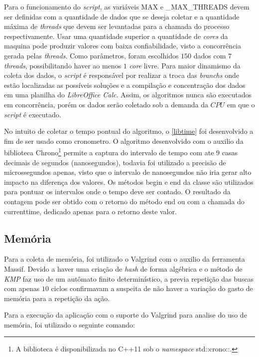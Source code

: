 Para o funcionamento do \textit{script}, as variáveis {\code MAX} e {\code \_MAX\_THREADS} devem ser definidas com a quantidade de dados que se deseja coletar e a quantidade máxima de \textit{threads} que devem ser levantadas para a chamada do processo respectivamente. Usar uma quantidade superior a quantidade de \textit{cores}  da maquina pode produzir valores com baixa confiabilidade, visto a concorrência gerada pelas \textit{threads}. Como parâmetros, foram escolhidos $150$ dados com $7$ \textit{threads}, possibilitando haver ao menos $1$ \textit{core} livre. Para maior dinamismo da coleta dos dados, o \textit{script} é responsável por realizar a troca das \textit{branchs} onde estão localizadas as possíveis soluções e a compilação e concentração dos dados em uma planilha do \textit{LibreOffice Calc}. Assim, os algoritmos nunca são executados em concorrência, porém os dados serão coletado sob a demanda da $CPU$ em que o \textit{script} é executado.

No intuito de coletar o tempo pontual do algoritmo, o \autoref{libtime} foi desenvolvido a fim de ser usado como cronometro. O algoritmo desenvolvido com o auxilio da biblioteca {\code Chrono}\footnote{A biblioteca é disponibilizada no {\code C++11} sob o \textit{namespace} {\code std::crono::}.} permite a captura do intervalo de tempo com ate $9$ casas decimais de segundos (nanosegundos), todavia foi utilizado a precisão de microssegundos apenas, visto que o intervalo de nanosegundos não iria gerar alto impacto na diferença dos valores. Os métodos {\code begin} e {\code end} da classe são utilizados para pontuar os intervalos onde o tempo deve ser contado. O resultado da contagem pode ser obtido com o retorno do método {\code end} ou com a chamada do {\code currenttime}, dedicado apenas para o retorno deste valor.

\subsection*{Memória}

Para a coleta de memória, foi utilizado o {\code Valgrind} com o auxilio da ferramenta {\code Massif}. Devido a haver uma criação de \textit{hash} de forma  algébrica e o método de \textit{KMP} faz uso de um autômato finito determinístico, a previa repetição das buscas com apenas $10$ ciclos confirmavam a suspeita de não haver a variação do gasto de memória para a repetição da ação.

Para a execução da aplicação com o suporte do {\code Valgrind} para analise do uso de memória, foi utilizado o seguinte comando:

